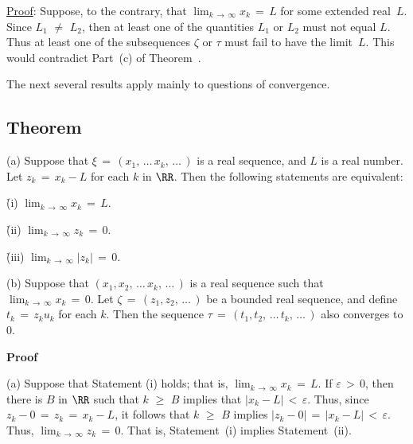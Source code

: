 \V

        \underline{Proof}: Suppose, to the contrary, that $\lim_{k \,{\rightarrow}\, {\infty}} x_{k} \,=\, L$ for some  extended real~$L$.
    Since $L_{1} \,\,{\neq}\,\, L_{2}$, then at least one of the quantities $L_{1}$ or $L_{2}$ must not equal $L$.
    Thus at least one of the subsequences ${\zeta}$ or ${\tau}$ must fail to have the limit~$L$.
    This would contradict Part~(c) of Theorem~.

\VV

        The next several results apply mainly to questions of convergence. 

\V


            \subsection{\small{\bf Theorem}}
            \label{ThmC20.10C}

\V

\hspace*{\parindent}(a) Suppose that ${\xi} \,=\, (x_{1},\,{\ldots}\,x_{k},\,{\ldots}\,)$
    is a real sequence, and $L$ is a real number. Let $z_{k} \,=\, x_{k}-L$ for each $k$ in ${\RR}$. Then the following statements are equivalent:

        \h (i) $\lim_{k \,{\rightarrow}\, {\infty}} x_{k} \,=\, L$.

        \h (ii) $\lim_{k \,{\rightarrow}\, {\infty}} z_{k} \,=\, 0$.

        \h (iii) $\lim_{k \,{\rightarrow}\, {\infty}} |z_{k}| \,=\, 0$.

\V

        (b) Suppose that $(x_{1},x_{2},\,{\ldots}\,x_{k}, \,{\ldots}\,)$ is
a real sequence such that $\lim_{k \,{\rightarrow}\, {\infty}} x_{k} \,=\, 0$.
    Let ${\zeta} \,=\, (z_{1},z_{2},\,{\ldots}\,)$ be a bounded real sequence, and define $t_{k} \,=\, z_{k}u_{k}$ for each $k$.
    Then the sequence ${\tau} \,=\, (t_{1},t_{2},\,{\ldots}\,t_{k},\,{\ldots}\,)$ also converges to $0$.

\V

        {\bf Proof}

\V

        (a) Suppose that Statement (i) holds; that is, $\lim_{k \,{\rightarrow}\, {\infty}} x_{k} \,=\, L$.
    If ${\varepsilon}\,>\,0$, then there is $B$ in ${\RR}$ such that $k\,\,{\geq}\,\,B$ implies that $|x_{k}-L|\,<\,{\varepsilon}$.
    Thus, since $z_{k}-0 \,=\, z_{k} \,=\, x_{k}-L$, it follows that $k\,\,{\geq}\,\,B$ implies $|z_{k}-0| \,=\, |x_{k}-L|\,<\,{\varepsilon}$.
    Thus, $\lim_{k \,{\rightarrow}\, {\infty}} z_{k} \,=\, 0$.
    That is, Statement~(i) implies Statement~(ii).

